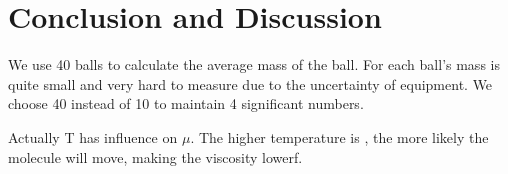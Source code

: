 \section{Conclusion and Discussion}



We use 40 balls to calculate the average mass of the ball.
For each ball's mass is quite small and very hard to measure due to the uncertainty of equipment.
We choose 40 instead of 10 to maintain 4 significant numbers.


Actually T has influence on $\mu$. The higher temperature is , the more likely the molecule will move, making the viscosity lowerf.
